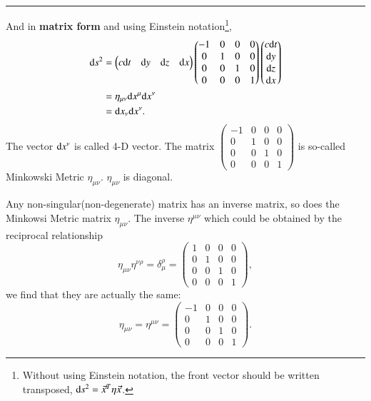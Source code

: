 \documentclass[openany,10pt]{book}
\theoremstyle{definition}
\theoremstyle{definition}
\theoremstyle{remark}
\begin{document}
\noindent\rule{\textwidth}{0.3mm}
\rem And in {\bfseries matrix form} and using Einstein notation\footnote{Without using Einstein notation, the front vector should be written transposed, ${\rm d}s^2=\vec x^T \eta \vec x$.},
\begin{equation}\label{eta}\begin{aligned}
  {\rm d}s^2&=
    \begin{pmatrix}
   c{\rm d}t & {\rm d}y & {\rm d}z & {\rm d}x
  \end{pmatrix}
  \begin{pmatrix}
   -1 & 0 & 0 & 0\\
   0 & 1 & 0 & 0\\
   0 & 0 & 1 & 0\\
   0 &0 & 0& 1
  \end{pmatrix}
  \begin{pmatrix}
   c{\rm d}t\\
  {\rm d}y \\
   {\rm d}z\\
   {\rm d}x
  \end{pmatrix}\\
  &=\eta_{\mu \nu}{\rm d}x^{\mu}{\rm d}x^{\nu}\\
&={\rm d}x_{\nu}{\rm d}x^{\nu}.
\end{aligned}
\end{equation}
The vector ${\rm d}x^{\nu}$ is called 4-D vector. The matrix $\begin{pmatrix}
   -1& 0 & 0 & 0\\
   0 & 1 & 0 & 0\\
   0 & 0 & 1 & 0\\
   0 &0 & 0& 1
  \end{pmatrix}$ is so-called Minkowski Metric $\eta_{\mu \nu}$. $\eta_{\mu \nu}$ is diagonal.

Any non-singular(non-degenerate) matrix has an inverse matrix, so does the Minkowsi Metric matrix $\eta_{\mu \nu}$. The inverse $\eta^{\mu \nu}$ which could be obtained by the reciprocal relationship
\begin{equation}
    \eta_{\mu \nu}\eta^{ \nu\rho}=\delta^\rho_\mu=\begin{pmatrix}
   1& 0 & 0 & 0\\
   0 & 1 & 0 & 0\\
   0 & 0 & 1 & 0\\
   0 &0 & 0& 1
  \end{pmatrix},
\end{equation}
we find that they are actually the same:
\begin{equation}
    \eta_{\mu \nu}=\eta^{\mu \nu}=\begin{pmatrix}
   -1& 0 & 0 & 0\\
   0 & 1 & 0 & 0\\
   0 & 0 & 1 & 0\\
   0 &0 & 0& 1
  \end{pmatrix}.
\end{equation}
\end{document}
